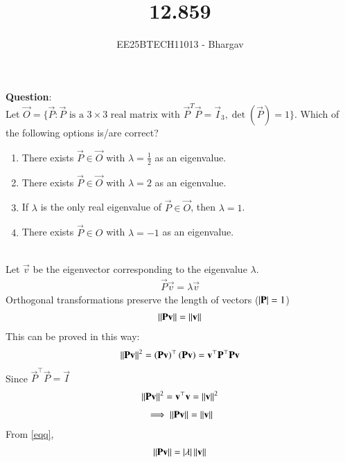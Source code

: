\documentclass[journal]{IEEEtran}
\begin{document}

\vspace{3cm}

\title{12.859}
\author{EE25BTECH11013 - Bhargav}
\maketitle
    {\let\newpage\relax\maketitle}

\renewcommand{\thefigure}{\theenumi}
\renewcommand{\thetable}{\theenumi}
\setlength{\intextsep}{10pt} %

\renewcommand{\thetable}{\theenumi}

\textbf{Question}: \\
Let $\vec{O} = \{\vec{P} : \vec{P} \text{ is a } 3 \times 3 \text{ real matrix with } \vec{P}^T\vec{P} = \vec{I}_3, \det(\vec{P}) = 1\}$. Which of the following options is/are correct?

\begin{enumerate}
    \item There exists $\vec{P} \in \vec{O}$ with $\lambda = \frac{1}{2}$ as an eigenvalue.
    \item There exists $\vec{P} \in \vec{O}$ with $\lambda = 2$ as an eigenvalue.
    \item If $\lambda$ is the only real eigenvalue of $\vec{P} \in 
    \vec{O}$, then $\lambda = 1$.
    \item There exists $\vec{P} \in O$ with $\lambda = -1$ as an eigenvalue.
\end{enumerate}

\solution \\
Let $\vec{v}$ be the eigenvector corresponding to the eigenvalue $\lambda$.
\begin{align}
\vec{P}\vec{v} = \lambda\vec{v} \label{eqq}
\end{align}
Orthogonal transformations preserve the length of vectors  ($\left\vert\mathbf{P}\right\vert = 1$)
\begin{align}
\left\lVert\mathbf{P}\mathbf{v}\right\rVert=\left\lVert\mathbf{v}\right\rVert \label{eq1}
\end{align}
This can be proved in this way:
\begin{align}
\left\lVert\mathbf{P}\mathbf{v}\right\rVert^2 = \left(\mathbf{P}\mathbf{v}\right)^\top\left(\mathbf{P}\mathbf{v}\right)=\mathbf{v}^\top\mathbf{P}^\top\mathbf{P}\mathbf{v}
\end{align}
Since $\vec{P}^\top \vec{P} = \vec{I}$
\begin{align}
\left\lVert\mathbf{P}\mathbf{v}\right\rVert^2 = \mathbf{v}^\top\mathbf{v} = \left\lVert\mathbf{v}\right\rVert^2
\end{align}
\begin{align}
\implies \left\lVert\mathbf{P}\mathbf{v}\right\rVert = \left\lVert\mathbf{v}\right\rVert
\end{align}
From \eqref{eqq}, 
\begin{align}
\left\lVert\mathbf{P}\mathbf{v}\right\rVert = \left\vert\lambda\right\vert\left\lVert\mathbf{v}\right\rVert \label{eq2}
\end{align}
\end{document}
